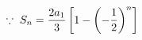 \documentclass[preview]{standalone}
\begin{document}
\begin{align*}
\special{dvisvgm:raw <g id='unique000'>}\because\; S_n=\frac{2a_1}{3}\left[1-\left(-\frac{1}{2}\right)^n\right]\special{dvisvgm:raw </g>}
\end{align*}
\end{document}
